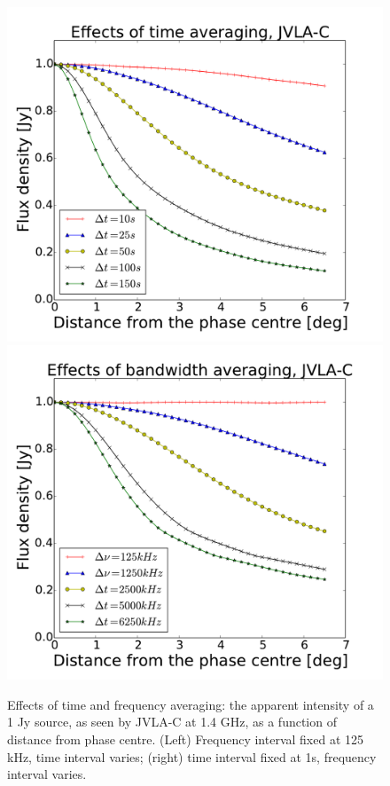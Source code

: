 \documentclass[useAMS,usenatbib]{mn2e}
\newcommand{\ATM}[1]{\textcolor{blue}{{\bf Marcellin: #1}}}
\newcommand{\GSF}[1]{\textcolor{red}{{\bf GSF: #1}}}
\begin{document}
\begin{figure}
\includegraphics[width=\columnwidth]{./Figures/effect_time_averaging.pdf}%
\includegraphics[width=\columnwidth]{./Figures/effect_bandwidth_averaging.pdf}
\caption{Effects of time and frequency averaging: the apparent intensity of a 1 Jy source, as seen by JVLA-C at 1.4 GHz, 
as a function of distance from phase centre. (Left) Frequency interval fixed at 125 kHz, time interval varies; 
(right) time interval fixed at 1s, frequency interval varies.
}\label{fig:smear}
\end{figure}
\end{document}
